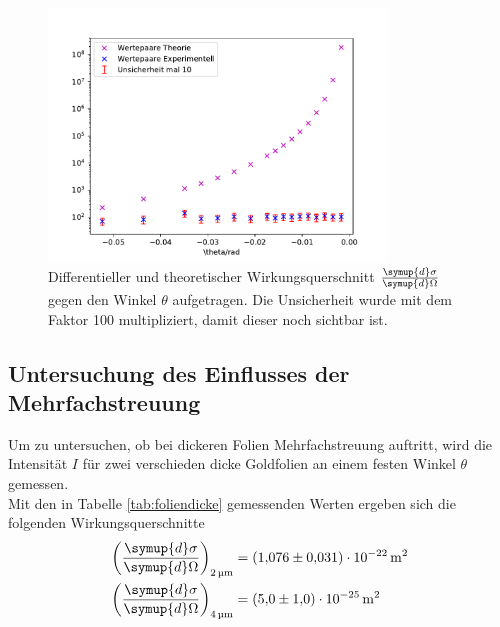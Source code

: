 \begin{figure}
    \centering
    \includegraphics[width=0.8\textwidth]{data/plots/Rutherford.pdf}
    \caption{Differentieller und theoretischer Wirkungsquerschnitt $\frac{\symup{d}\sigma}{\symup{d}\Omega}$ gegen den Winkel $\theta$ aufgetragen. Die Unsicherheit wurde mit dem Faktor 100 multipliziert, damit dieser noch sichtbar ist.}
    \label{fig:ruther}
\end{figure}

\FloatBarrier

\subsection{Untersuchung des Einflusses der Mehrfachstreuung}
Um zu untersuchen, ob bei dickeren Folien Mehrfachstreuung auftritt, wird die Intensität $I$ für zwei verschieden dicke Goldfolien an einem festen Winkel $\theta$ gemessen. \\
Mit den in Tabelle \ref{tab:foliendicke} gemessenden Werten ergeben sich die folgenden Wirkungsquerschnitte
\begin{align*}
    \left(\frac{\symup{d}\sigma}{\symup{d}\Omega}\right)_\text{\SI{2}{\micro \meter}} &= \SI{1,076(31)e-22}{\meter}^2 \\
    \left(\frac{\symup{d}\sigma}{\symup{d}\Omega}\right)_\text{\SI{4}{\micro \meter}} &= \SI{5,0(10)e-25}{\meter}^2
\end{align*}

\FloatBarrier

